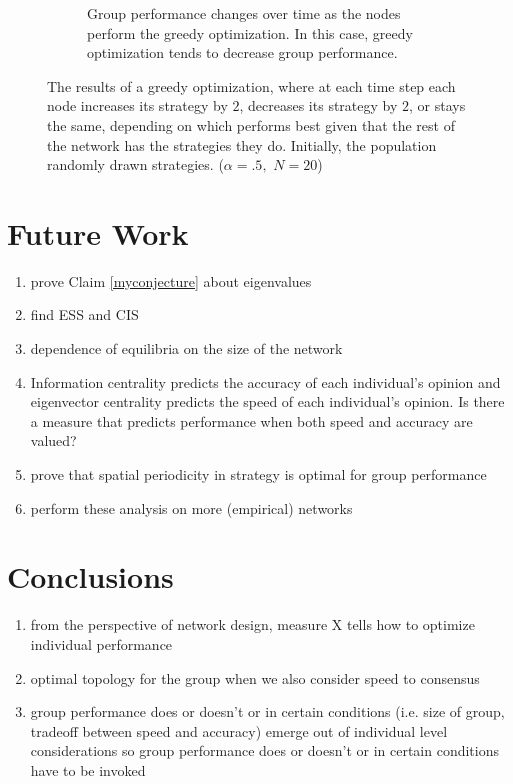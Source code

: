 \documentclass{article}
\begin{document}
\begin{figure}
\begin{subfigure}{.5 \textwidth}
\begin{center}
\end{center}
\caption{Group performance changes over time as the nodes perform the greedy optimization.  In this case, greedy optimization tends to decrease group performance.}
\end{subfigure}
\caption{\label{greedy_opt_v2} The results of a greedy optimization, where at each time step each node increases its strategy by $2$, decreases its strategy by $2$, or stays the same, depending on which performs best given that the rest of the network has the strategies they do.  Initially, the population randomly drawn strategies. ($\alpha=.5,$ $N=20$)}
\end{figure}



\section{Future Work}

\begin{enumerate}
\item prove Claim \ref{myconjecture} about eigenvalues
\item find ESS and CIS 
\item dependence of equilibria on the size of the network
\item Information centrality predicts the accuracy of each individual's opinion and eigenvector centrality predicts the speed of each individual's opinion.  Is there a measure that predicts performance when both speed and accuracy are valued?
\item prove that spatial periodicity in strategy is optimal for group performance
\item perform these analysis on more (empirical) networks
\end{enumerate}

\section{Conclusions }

\begin{enumerate}
\item from the perspective of network design, measure X tells how to optimize individual performance
\item optimal topology for the group when we also consider speed to consensus
\item group performance does or doesn't or in certain conditions (i.e. size of group, tradeoff between speed and accuracy) emerge out of individual level considerations so group performance does or doesn't or in certain conditions have to be invoked
\end{enumerate}

\nocite{*}


\end{document}
